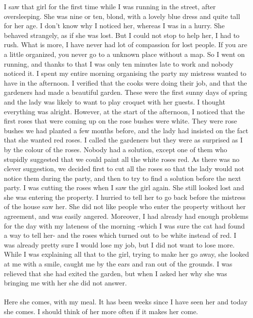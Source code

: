 \documentclass[a4paper]{article}
\begin{document}
I saw that girl for the first time while I was running in the street, after oversleeping. She was nine or ten, blond, with a lovely blue dress and quite tall for her age. I don't know why I noticed her, whereas I was in a hurry. She behaved strangely, as if she was lost. But I could not stop to help her, I had to rush. What is more, I have never had lot of compassion for lost people. If you are a little organized, you never go to a unknown place without a map. So I went on running, and thanks to that I was only ten minutes late to work and nobody noticed it. I spent my entire morning organising the party my mistress wanted to have in the afternoon. I verified that the cooks were doing their job, and that the gardeners had made a beautiful garden. These were the first sunny days of spring and the lady was likely to want to play croquet with her guests. I thought everything was alright. However, at the start of the afternoon, I noticed that the first roses that were coming up on the rose bushes were white. They were rose bushes we had planted a few months before, and the lady had insisted on the fact that she wanted red roses. I called the gardeners but they were as surprised as I by the colour of the roses. Nobody had a solution, except one of them who stupidly suggested that we could paint all the white roses red. As there was no clever suggestion, we decided first to cut all the roses so that the lady would not notice them during the party, and then to try to find a solution before the next party. I was cutting the roses when I saw the girl again. She still looked lost and she was entering the property. I hurried to tell her to go back before the mistress of the house saw her. She did not like people who enter the property without her agreement, and was easily angered. Moreover, I had already had enough problems for the day with my lateness of the morning -which I was sure the cat had found a way to tell her- and the roses which turned out to be white instead of red. I was already pretty sure I would lose my job, but I did not want to lose more. While I was explaining all that to the girl, trying to make her go away, she looked at me with a smile, caught me by the ears and ran out of the grounds. I was relieved that she had exited the garden, but when I asked her why she was bringing me with her she did not answer.\\
\\
Here she comes, with my meal. It has been weeks since I have seen her and today she comes. I should think of her more often if it makes her come.\\
\end{document}
